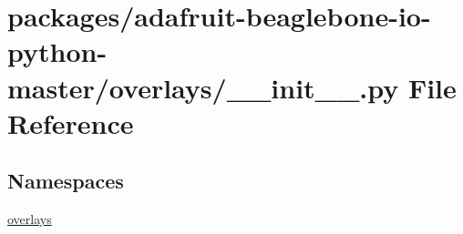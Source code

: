 \hypertarget{packages_2adafruit-beaglebone-io-python-master_2overlays_2____init_____8py}{}\section{packages/adafruit-\/beaglebone-\/io-\/python-\/master/overlays/\+\_\+\+\_\+init\+\_\+\+\_\+.py File Reference}
\label{packages_2adafruit-beaglebone-io-python-master_2overlays_2____init_____8py}
\subsection*{Namespaces}
\begin{DoxyCompactItemize}
\item 
 \hyperlink{namespaceoverlays}{overlays}
\end{DoxyCompactItemize}
